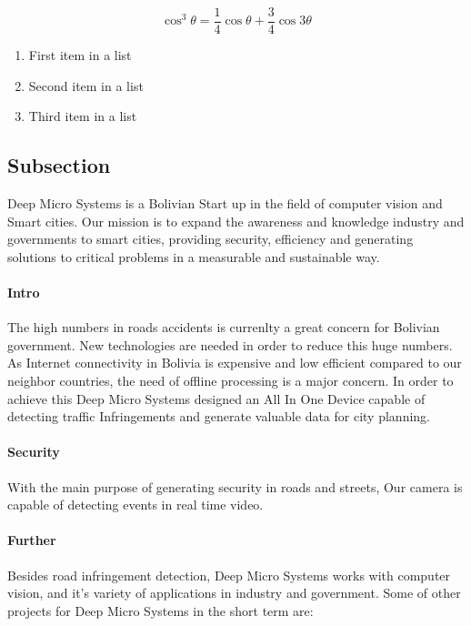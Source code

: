 \documentclass[fleqn,12pt]{SelfArx} %
\begin{document}
\lipsum[4] %

\begin{equation}
\cos^3 \theta =\frac{1}{4}\cos\theta+\frac{3}{4}\cos 3\theta
\label{eq:refname2}
\end{equation}

\lipsum[5] %

\begin{enumerate}[noitemsep] %
\item First item in a list
\item Second item in a list
\item Third item in a list
\end{enumerate}

\subsection{Subsection}

Deep Micro Systems is a Bolivian Start up in the field of computer vision and Smart cities. Our mission is to  expand the awareness and knowledge industry and governments to smart cities, providing security, efficiency and generating solutions to critical problems in a measurable and sustainable way.

\paragraph{Intro} The high numbers in roads accidents is currenlty a great concern for Bolivian government. New technologies are needed in order to reduce this huge numbers. As Internet connectivity in Bolivia is expensive and low efficient compared to our neighbor countries, the need of offline processing is a major concern. In order to achieve this Deep Micro Systems designed an All In One Device capable of detecting traffic Infringements and generate valuable data for city planning.

\paragraph{Security} With the main purpose of generating security in roads and streets, Our camera is capable of detecting events in real time video.

\paragraph{Further} Besides road infringement detection, Deep Micro Systems works with computer vision, and it's variety of applications in industry and government. Some of other projects for Deep Micro Systems in the short term are:
\end{document}
